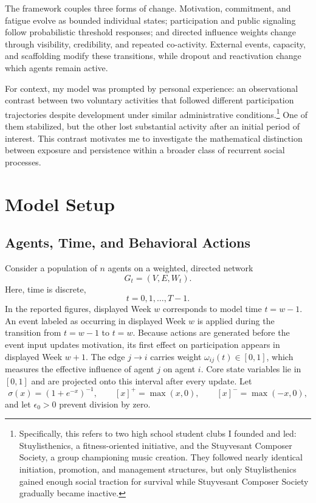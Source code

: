 \documentclass[11pt]{article}
\begin{document}
The framework couples three forms of change. Motivation, commitment, and fatigue evolve as bounded individual states; participation and public signaling follow probabilistic threshold responses; and directed influence weights change through visibility, credibility, and repeated co-activity. External events, capacity, and scaffolding modify these transitions, while dropout and reactivation change which agents remain active. 

For context, my model was prompted by personal experience: an observational contrast between two voluntary activities that followed different participation trajectories despite development under similar administrative conditions.\footnote{Specifically, this refers to two high school student clubs I founded and led: Stuylisthenics, a fitness-oriented initiative, and the Stuyvesant Composer Society, a group championing music creation. They followed nearly identical initiation, promotion, and management structures, but only Stuylisthenics gained enough social traction for survival while Stuyvesant Composer Society gradually became inactive.} One of them stabilized, but the other lost substantial activity after an initial period of interest. This contrast motivates me to investigate the mathematical distinction between exposure and persistence within a broader class of recurrent social processes.

\section{Model Setup}
\subsection{Agents, Time, and Behavioral Actions }
Consider a population of $n$ agents on a weighted, directed network 
\[
G_t=(V,E,W_t).
\]
Here, time is discrete, \[t=0,1,\ldots,T-1.\]
In the reported figures, displayed Week $w$ corresponds to model time $t=w-1$. An event labeled as occurring in displayed Week $w$ is applied during the transition from $t=w-1$ to $t=w$. Because actions are generated before the event input updates motivation, its first effect on participation appears in displayed Week $w+1$.  The edge $j\rightarrow i$ carries weight $\omega_{ij}(t)\in[0,1]$, which measures the effective influence of agent $j$ on agent $i$. Core state variables lie in $[0,1]$ and are projected onto this interval after every update. Let
\[
\sigma(x)=(1+e^{-x})^{-1}, \qquad
[x]^+=\max(x,0), \qquad
[x]^-=\max(-x,0),
\]
and let $\epsilon_0>0$ prevent division by zero.
\end{document}
